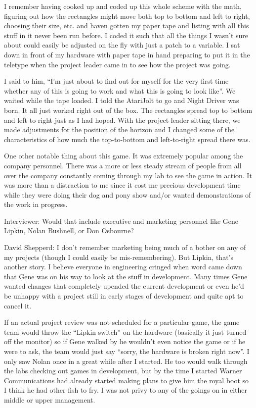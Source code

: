I remember having cooked up and coded up this whole scheme with the math, figuring out how the rectangles might move both top to bottom and left to right, choosing their size, etc. and haven gotten my paper tape and listing with all this stuff in it never been run before. I coded it such that all the things I wasn't sure about could easily be adjusted on the fly with just a patch to a variable. I sat down in front of my hardware with paper tape in hand preparing to put it in the teletype when the project leader came in to see how the project was going. 

I said to him, “I'm just about to find out for myself for the very first time whether any of this is going to work and what this is going to look like”. We waited while the tape loaded. I told the AtariJolt to go and Night Driver was born. It all just worked right out of the box. The rectangles spread top to bottom and left to right just as I had hoped. With the project leader sitting there, we made adjustments for the position of the horizon and I changed some of the characteristics of how much the top-to-bottom and left-to-right spread there was.

One other notable thing about this game. It was extremely popular among the company personnel. There was a more or less steady stream of people from all over the company constantly coming through my lab to see the game in action. It was more than a distraction to me since it cost me precious development time while they were doing their dog and pony show and/or wanted demonstrations of the work in progress.

\textcolor{interviewer}{Interviewer:} Would that include executive and marketing personnel like Gene Lipkin, Nolan Bushnell, or Don Osbourne?

\textcolor{interviewee}{David Shepperd:} I don't remember marketing being much of a bother on any of my projects (though I could easily be mis-remembering). But Lipkin, that's another story. I believe everyone in engineering cringed when word came down that Gene was on his way to look at the stuff in development. Many times Gene wanted changes that completely upended the current development or even he'd be unhappy with a project still in early stages of development and quite apt to cancel it. 

If an actual project review was not scheduled for a particular game, the game team would throw the “Lipkin switch” on the hardware (basically it just turned off the monitor) so if Gene walked by he wouldn't even notice the game or if he were to ask, the team would just say “sorry, the hardware is broken right now”. I only saw Nolan once in a great while after I started. He too would walk through the labs checking out games in development, but by the time I started Warner Communications had already started making plans to give him the royal boot so I think he had other fish to fry. I was not privy to any of the goings on in either middle or upper management. 


